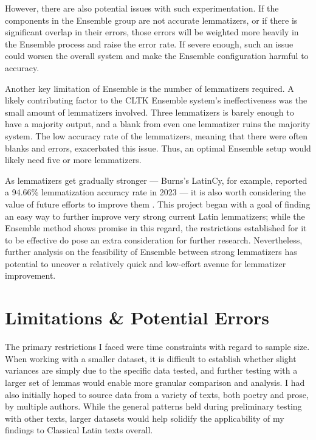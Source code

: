 \documentclass[11pt]{article}
\begin{document}
However, there are also potential issues with such experimentation. If the components in the Ensemble group are not accurate lemmatizers, or if there is significant overlap in their errors, those errors will be weighted more heavily in the Ensemble process and raise the error rate. If severe enough, such an issue could worsen the overall system and make the Ensemble configuration harmful to accuracy.

Another key limitation of Ensemble is the number of lemmatizers required. A likely contributing factor to the CLTK Ensemble system’s ineffectiveness was the small amount of lemmatizers involved. Three lemmatizers is barely enough to have a majority output, and a blank from even one lemmatizer ruins the majority system. The low accuracy rate of the lemmatizers, meaning that there were often blanks and errors, exacerbated this issue. Thus, an optimal Ensemble setup would likely need five or more lemmatizers.

As lemmatizers get gradually stronger --- Burns’s LatinCy, for example, reported a 94.66\% lemmatization accuracy rate in 2023 --- it is also worth considering the value of future efforts to improve them \cite{latincy}. This project began with a goal of finding an easy way to further improve very strong current Latin lemmatizers; while the Ensemble method shows promise in this regard, the restrictions established for it to be effective do pose an extra consideration for further research. Nevertheless, further analysis on the feasibility of Ensemble between strong lemmatizers has potential to uncover a relatively quick and low-effort avenue for lemmatizer improvement.

\section{Limitations \& Potential Errors}

The primary restrictions I faced were time constraints with regard to sample size. When working with a smaller dataset, it is difficult to establish whether slight variances are simply due to the specific data tested, and further testing with a larger set of lemmas would enable more granular comparison and analysis. I had also initially hoped to source data from a variety of texts, both poetry and prose, by multiple authors. While the general patterns held during preliminary testing with other texts, larger datasets would help solidify the applicability of my findings to Classical Latin texts overall.
\end{document}
